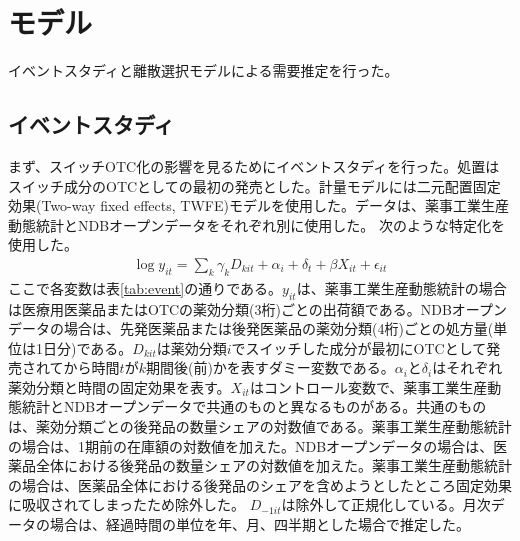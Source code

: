 \documentclass[a4paper,11pt,uplatex]{jsarticle}
\theoremstyle{definition}
\begin{document}
\section{モデル}
イベントスタディと離散選択モデルによる需要推定を行った。
\subsection{イベントスタディ}
まず、スイッチOTC化の影響を見るためにイベントスタディを行った。処置はスイッチ成分のOTCとしての最初の発売とした。計量モデルには二元配置固定効果(Two-way fixed effects, TWFE)モデルを使用した。データは、薬事工業生産動態統計とNDBオープンデータをそれぞれ別に使用した。
次のような特定化を使用した。
\begin{align*}
\log y_{it} =\sum_k \gamma_k D_{kit}+\alpha_i +\delta_t+\beta X_{it}+\epsilon_{it}
\end{align*}
ここで各変数は表\ref{tab:event}の通りである。\(y_{it}\)は、薬事工業生産動態統計の場合は医療用医薬品またはOTCの薬効分類(3桁)ごとの出荷額である。NDBオープンデータの場合は、先発医薬品または後発医薬品の薬効分類(4桁)ごとの処方量(単位は1日分)である。\(D_{kit}\)は薬効分類\(i\)でスイッチした成分が最初にOTCとして発売されてから時間\(t\)が\(k\)期間後(前)かを表すダミー変数である。\(\alpha_i\)と\(\delta_i\)はそれぞれ薬効分類と時間の固定効果を表す。\(X_{it}\)はコントロール変数で、薬事工業生産動態統計とNDBオープンデータで共通のものと異なるものがある。共通のものは、薬効分類ごとの後発品の数量シェアの対数値である。薬事工業生産動態統計の場合は、1期前の在庫額の対数値を加えた。NDBオープンデータの場合は、医薬品全体における後発品の数量シェアの対数値を加えた。薬事工業生産動態統計の場合は、医薬品全体における後発品のシェアを含めようとしたところ固定効果に吸収されてしまったため除外した。
\(D_{-1it}\)は除外して正規化している。月次データの場合は、経過時間の単位を年、月、四半期とした場合で推定した。
\end{document}
